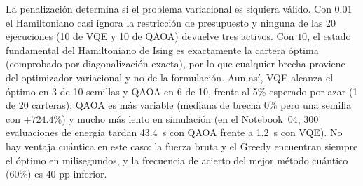 \begin{table}[ht]
\centering
\footnotesize
\setlength{\tabcolsep}{4pt}
\caption{Caso~4: 10 semillas por método y configuración (\texttt{qml\_v2.portfolio}). Brecha $=100\,(\text{coste}-\text{óptimo})/|\text{óptimo}|$, promediada solo sobre las semillas factibles; el óptimo es pequeño ($0.0437$), de modo que brechas porcentuales grandes corresponden a diferencias absolutas modestas (la peor, $0.3604$ frente a $0.0437$). Con penalización $0.01$ ninguna semilla devuelve una cartera factible.}
\label{tab:portafolio}
\end{table}

La penalización determina si el problema variacional es siquiera válido. Con $0.01$ el Hamiltoniano casi ignora la restricción de presupuesto y ninguna de las 20 ejecuciones (10 de VQE y 10 de QAOA) devuelve tres activos. Con $10$, el estado fundamental del Hamiltoniano de Ising es exactamente la cartera óptima (comprobado por diagonalización exacta), por lo que cualquier brecha proviene del optimizador variacional y no de la formulación. Aun así, VQE alcanza el óptimo en 3 de 10 semillas y QAOA en 6 de 10, frente al 5\% esperado por azar (1 de 20 carteras); QAOA es más variable (mediana de brecha $0\%$ pero una semilla con $+724.4\%$) y mucho más lento en simulación (en el Notebook~04, 300 evaluaciones de energía tardan 43.4~s con QAOA frente a 1.2~s con VQE). No hay ventaja cuántica en este caso: la fuerza bruta y el Greedy encuentran siempre el óptimo en milisegundos, y la frecuencia de acierto del mejor método cuántico (60\%) es $40$ pp inferior.


